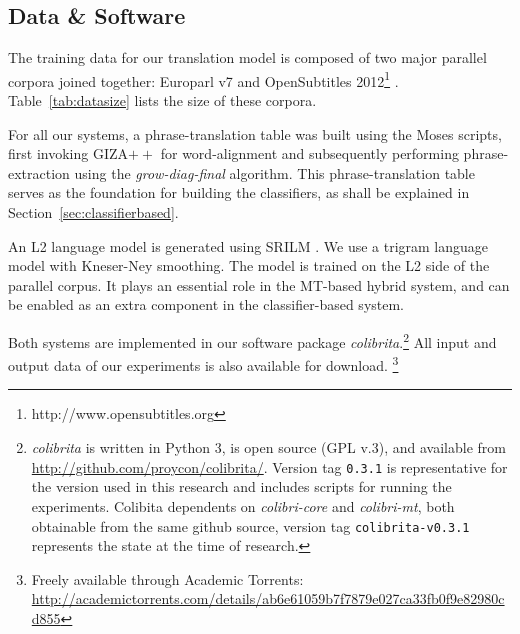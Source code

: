 \subsection{Data \& Software}

The training data for our translation model is composed of two major
parallel corpora joined together: Europarl v7 \citep{EUROPARL} and
OpenSubtitles 2012\footnote{http://www.opensubtitles.org}
\citep{OPUS2012}.  Table~\ref{tab:datasize} lists the size of these
corpora. 

\begin{table}[htb]
\caption{Corpora sizes for all of the language pairs}
\label{tab:datasize}
\noindent{}
\end{table}

For all our systems, a phrase-translation table was built using the Moses
scripts, first invoking GIZA$++$ for word-alignment and subsequently performing
phrase-extraction using the \emph{grow-diag-final} algorithm. This
phrase-translation table serves as the foundation for building the classifiers,
as shall be explained in Section~\ref{sec:classifierbased}.

An L2 language model is generated using SRILM \citep{SRILM}. We use a trigram
language model with Kneser-Ney smoothing. The model is trained on the L2 side
of the parallel corpus. It plays an essential role in the MT-based hybrid system,
and can be enabled as an extra component in the classifier-based system. 

Both systems are implemented in our software package
\emph{colibrita}.\footnote{\emph{colibrita} is written in Python 3, is open source
  (GPL v.3), and available from
  \url{http://github.com/proycon/colibrita/}. Version tag
  \texttt{0.3.1} is representative for the version used in this
  research and includes scripts for running the experiments.
  Colibita dependents on \emph{colibri-core} and \emph{colibri-mt}, both obtainable from the same github source, version tag \texttt{colibrita-v0.3.1} represents the state at
  the time of research.
  }
All input and output data of our experiments is also available for
download. \footnote{Freely available through Academic Torrents: \url{http://academictorrents.com/details/ab6e61059b7f7879e027ca33fb0f9e82980cd855} }

